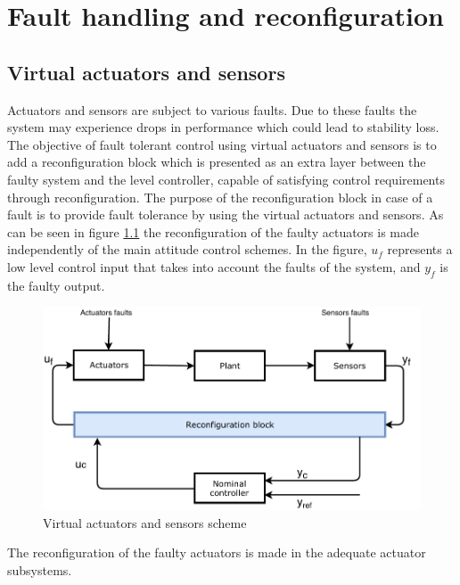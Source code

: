 \chapter{Fault handling and reconfiguration}  \label{chap:faltHandling}
 \section{Virtual actuators and sensors} \label{chap: virtual}
 Actuators and sensors are subject to various faults. Due to these faults the system may experience drops in performance which could lead to stability loss. The objective of fault tolerant control using virtual actuators and sensors is to add a reconfiguration block which is presented as an extra layer between the faulty system and the level controller, capable of satisfying control requirements through reconfiguration. The purpose of the reconfiguration block in case of a fault is to provide fault tolerance by using the virtual actuators and sensors. As can be seen in figure \ref{fig:VA} the reconfiguration of the faulty actuators is made independently of the main attitude control schemes.  In the figure, $u_f$ represents a low level control input that takes into account the faults of the system, and $y_f$ is the faulty output. 
 \begin{figure}[H]
 	\centering
 	\includegraphics[width=0.8\linewidth]{figures/VirtualActuator}
 	\caption{ Virtual actuators and sensors scheme}
 	\label{fig:VA}
 \end{figure}
 
 The reconfiguration of the faulty actuators is made in the adequate actuator subsystems. 
 
% 

